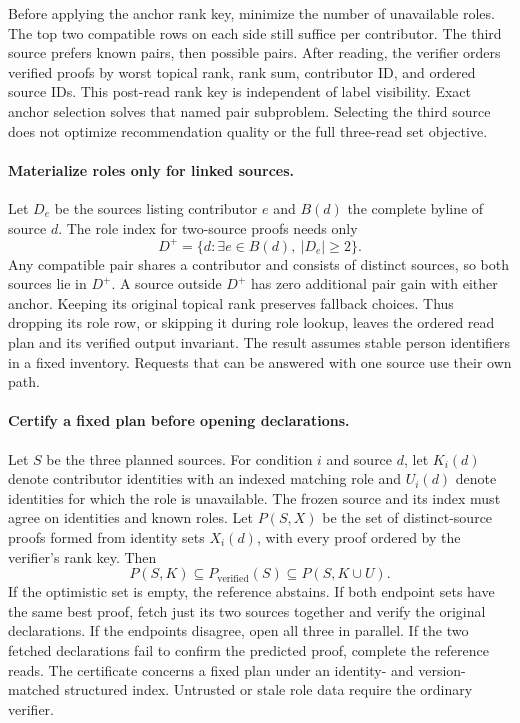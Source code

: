 \documentclass[sigconf,natbib=true,anonymous=true,pbalance=true]{acmart}
\begin{document}
Before applying the anchor rank key, minimize the number of unavailable roles. The top two compatible rows on each side still suffice per contributor. The third source prefers known pairs, then possible pairs. After reading, the verifier orders verified proofs by worst topical rank, rank sum, contributor ID, and ordered source IDs. This post-read rank key is independent of label visibility. Exact anchor selection solves that named pair subproblem. Selecting the third source does not optimize recommendation quality or the full three-read set objective.

\paragraph{Materialize roles only for linked sources.}
Let $D_e$ be the sources listing contributor $e$ and $B(d)$ the complete byline of source $d$. The role index for two-source proofs needs only
\begin{equation}
D^{+}=\{d : \exists e\in B(d),\ |D_e|\ge 2\}.
\label{eq:linked-index}
\end{equation}
Any compatible pair shares a contributor and consists of distinct sources, so both sources lie in $D^{+}$. A source outside $D^{+}$ has zero additional pair gain with either anchor. Keeping its original topical rank preserves fallback choices. Thus dropping its role row, or skipping it during role lookup, leaves the ordered read plan and its verified output invariant. The result assumes stable person identifiers in a fixed inventory. Requests that can be answered with one source use their own path.

\paragraph{Certify a fixed plan before opening declarations.}
Let $S$ be the three planned sources. For condition $i$ and source $d$, let $K_i(d)$ denote contributor identities with an indexed matching role and $U_i(d)$ denote identities for which the role is unavailable. The frozen source and its index must agree on identities and known roles. Let $P(S,X)$ be the set of distinct-source proofs formed from identity sets $X_i(d)$, with every proof ordered by the verifier's rank key. Then
\[
P(S,K)\subseteq P_{\mathrm{verified}}(S)\subseteq P(S,K\cup U).
\]
If the optimistic set is empty, the reference abstains. If both endpoint sets have the same best proof, fetch just its two sources together and verify the original declarations. If the endpoints disagree, open all three in parallel. If the two fetched declarations fail to confirm the predicted proof, complete the reference reads. The certificate concerns a fixed plan under an identity- and version-matched structured index. Untrusted or stale role data require the ordinary verifier.
\end{document}

